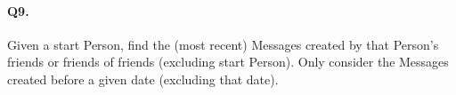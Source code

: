 \paragraph{Q9.}

Given a start Person, find the (most recent) Messages created by that
Person's friends or friends of friends (excluding start Person). Only
consider the Messages created before a given date (excluding that date).
